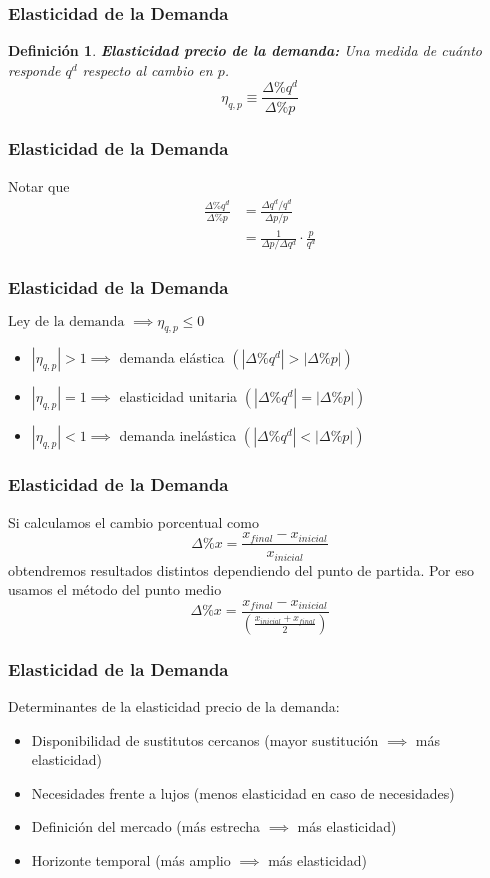\documentclass{beamer}
\newtheorem{mydef}{Definición}
\newcommand{\peq}[1]{{\scriptscriptstyle{#1}}}
\newcommand{\rp}[1]{\left(#1\right)}
\begin{document}
		\begin{frame}
			\frametitle{Elasticidad de la Demanda}
			\begin{mydef}
				\textbf{Elasticidad precio de la demanda:} Una medida de cuánto responde $q^\peq{d}$ respecto al cambio en $p$. $$\eta_\peq{q,p}\equiv\frac{\Delta\%q^\peq{d}}{\Delta\%p}$$
			\end{mydef}
		\end{frame}

		\begin{frame}
			\frametitle{Elasticidad de la Demanda}
			Notar que
			\begin{align*}
				\frac{\Delta\%q^\peq{d}}{\Delta\%p}&=\frac{\Delta q^\peq{d}/q^\peq{d}}{\Delta p/p} \\
																					 &=\frac{1}{\Delta p / \Delta q^\peq{d}}\cdot\frac{p}{q^\peq{d}}								
			\end{align*}
		\end{frame}

		\begin{frame}
			\frametitle{Elasticidad de la Demanda}
			$\text{Ley de la demanda }\implies\eta_\peq{q,p}\leq0$
			\begin{itemize}
				\item $\left|\eta_\peq{q,p}\right|>1\implies$ demanda elástica $\rp{\left|\Delta\%q^\peq{d}\right|>\left|\Delta\%p\right|}$
				\item $\left|\eta_\peq{q,p}\right|=1\implies$ elasticidad unitaria $\rp{\left|\Delta\%q^\peq{d}\right|=\left|\Delta\%p\right|}$
				\item $\left|\eta_\peq{q,p}\right|<1\implies$ demanda inelástica $\rp{\left|\Delta\%q^\peq{d}\right|<\left|\Delta\%p\right|}$
			\end{itemize}
		\end{frame}

		\begin{frame}
			\frametitle{Elasticidad de la Demanda}
			Si calculamos el cambio porcentual como $$\Delta\%x=\frac{x_\peq{final}-x_\peq{inicial}}{x_\peq{inicial}}$$ obtendremos resultados distintos dependiendo del punto de partida. Por eso usamos el método del punto medio $$\Delta\%x=\frac{x_\peq{final}-x_\peq{inicial}}{\rp{\frac{x_\peq{inicial}+x_\peq{final}}{2}}}$$
		\end{frame}

		\begin{frame}
			\frametitle{Elasticidad de la Demanda}
			Determinantes de la elasticidad precio de la demanda:
			\begin{itemize}
				\item Disponibilidad de sustitutos cercanos (mayor sustitución $\implies$ más elasticidad)
				\item Necesidades frente a lujos (menos elasticidad en caso de necesidades)
				\item Definición del mercado (más estrecha $\implies$ más elasticidad)
				\item Horizonte temporal (más amplio $\implies$ más elasticidad)
			\end{itemize}
		\end{frame}
\end{document}
